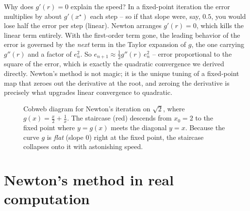 \begin{whybox}
Why does $g'(r) = 0$ explain the speed? In a fixed-point iteration the error
multiplies by about $g'(x^\star)$ each step -- so if that slope were, say, $0.5$, you
would lose half the error per step (linear). Newton arranges $g'(r) = 0$, which kills
the linear term entirely. With the first-order term gone, the leading behavior of
the error is governed by the \emph{next} term in the Taylor expansion of $g$, the
one carrying $g''(r)$ and a factor of $e_n^2$. So $e_{n+1} \approx \tfrac12
g''(r)\,e_n^2$ -- error proportional to the square of the error, which is exactly the
quadratic convergence we derived directly. Newton's method is not magic; it is the
unique tuning of a fixed-point map that zeroes out the derivative at the root, and
zeroing the derivative is precisely what upgrades linear convergence to quadratic.
\end{whybox}

\begin{figure}[H]
\centering
{}
\caption{Cobweb diagram for Newton's iteration on $\sqrt2$, where $g(x)=\tfrac{x}{2}
+\tfrac1x$. The staircase (red) descends from $x_0=2$ to the fixed point where
$y=g(x)$ meets the diagonal $y=x$. Because the curve $g$ is \emph{flat} (slope $0$)
right at the fixed point, the staircase collapses onto it with astonishing speed.}
\label{ch19:fig-cobweb}
\end{figure}

\section{Newton's method in real computation}
\label{ch19:computing}

